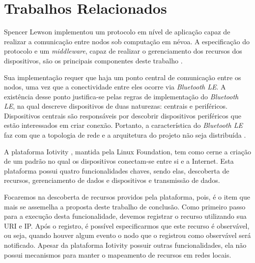 \section{Trabalhos Relacionados}

Spencer Lewson implementou um protocolo em nível de aplicação \cite{tanenbaum2011redes} capaz de realizar a comunicação entre nodos sob computação em névoa.
A especificação do protocolo e um \textit{middleware}, capaz de realizar o gerenciamento dos recursos dos dispositivos, são os principais componentes deste trabalho \cite{Spencer:2015}.

Sua implementação requer que haja um ponto central de comunicação entre os nodos, uma vez que a conectividade entre eles ocorre via \textit{Bluetooth LE}.
A existência desse ponto justifica-se pelas regras de implementação do \textit{Bluetooth LE}, na qual descreve dispositivos de duas naturezas: centrais e periféricos.
Dispositivos centrais são responsáveis por descobrir dispositivos periféricos que estão interessados em criar conexão.
Portanto, a característica do \textit{Bluetooth LE} faz com que a topologia de rede e a arquitetura do projeto não seja distribuída \cite{Spencer:2015}.

A plataforma Iotivity \cite{iotivity}, mantida pela Linux Foundation, tem como cerne a criação de um padrão no qual os dispositivos conectam-se entre si e a Internet.
Esta plataforma possui quatro funcionalidades chaves, sendo elas, descoberta de recursos, gerenciamento de dados e dispositivos e transmissão de dados.

Focaremos na descoberta de recursos providos pela plataforma, pois, é o item que mais se assemelha a proposta deste trabalho de conclusão.
Como primeiro passo para a execução desta funcionalidade, devemos registrar o recurso utilizando sua URI e IP.
Após o registro, é possível especificarmos que este recurso é observável, ou seja, quando houver algum evento o nodo que o registrou como observável será notificado.
Apesar da plataforma Iotivity possuir outras funcionalidades, ela não possui mecanismos para manter o mapeamento de recursos em redes locais.

